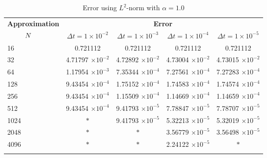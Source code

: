 	\begin{table}[H]
		\begin{tabular}{lcccc}
			\toprule
			\multicolumn{1}{c}{\textbf{Approximation}} & \multicolumn{4}{c}{\textbf{Error}} \\
			$\hspace{9mm}N$ & $\Delta t=1\times 10^{-2}$ & $\Delta t=1\times 10^{-3}$ & $\Delta t=1\times 10^{-4}$ & $\Delta t=1\times 10^{-5}$ \\
			\midrule
			\hspace{7mm} 16 & 0.721112    & 0.721112    & 0.721112    & 0.721112    \\
			\midrule
			\hspace{7mm} 32 & 4.71797 $\times 10^{-2}$   & 4.72892 $\times 10^{-2}$   & 4.73004 $\times 10^{-2}$   & 4.73015 $\times 10^{-2}$   \\
			\midrule
			\hspace{7mm} 64 & 1.17954 $\times 10^{-3}$  & 7.35344 $\times 10^{-4}$ & 7.27561 $\times 10^{-4}$ & 7.27283 $\times 10^{-4}$  \\
			\midrule
			\hspace{7mm} 128 & 9.43454 $\times 10^{-4}$ & 1.75152 $\times 10^{-4}$ & 1.74583 $\times 10^{-4}$ & 1.74574 $\times 10^{-4}$ \\
			\midrule
			\hspace{7mm} 256 & 9.43454 $\times 10^{-4}$ & 1.15509 $\times 10^{-4}$ & 1.14669 $\times 10^{-4}$ & 1.14659 $\times 10^{-4}$ \\
			\midrule
			\hspace{7mm} 512 & 9.43454 $\times 10^{-4}$ & 9.41793 $\times 10^{-5}$ & 7.78847 $\times 10^{-5}$ & 7.78707 $\times 10^{-5}$ \\
			\midrule
			\hspace{7mm} 1024 & $\ast$         & 9.41793 $\times 10^{-5}$ & 5.32213 $\times 10^{-5}$ & 5.32019 $\times 10^{-5}$ \\
			\midrule
			\hspace{7mm} 2048 & $\ast$           & $\ast$           & 3.56779 $\times 10^{-5}$ & 3.56498 $\times 10^{-5}$ \\
			\midrule
			\hspace{7mm} 4096 & $\ast$           & $\ast$           & 2.24122 $\times 10^{-5}$ & $\ast$           \\
			\\
			\bottomrule
		\end{tabular}
		\caption{Error using $L^2$-norm with $\alpha=1.0$}
		\label{Collocation_tabla_L2_alpha=1}

\end{table}
